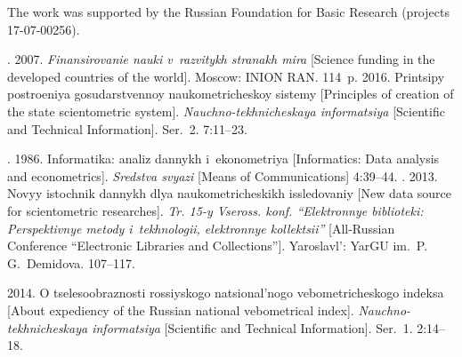     
     


\Ack
    \noindent
     The work was supported by the Russian Foundation for Basic Research  
(projects 17-07-00256).



\vspace*{6pt}

  \begin{multicols}{2}

\renewcommand{\bibname}{\protect\rmfamily References}

{\small\frenchspacing
 {%
 \begin{thebibliography}{99} 
    . 2007. \textit{Finansirovanie nauki 
v~razvitykh stranakh mira} [Science funding in the developed countries of the 
world]. Moscow: INION RAN. 114~p.
     2016. Printsipy postroeniya gosudarstvennoy 
naukometricheskoy sistemy [Principles of creation of the state scientometric system]. 
\textit{Nauchno-tekhnicheskaya informatsiya} [Scientific and Technical 
Information]. Ser.~2. 7:11--23.

    . 1986. Informatika: analiz 
dannykh i~ekonometriya  [Informatics: Data  analysis  and econometrics]. 
\textit{Sredstva  svyazi}  [Means of Communications] 4:39--44.
    . 2013. Novyy istochnik dannykh 
dlya naukometricheskikh issledovaniy [New data source for scientometric 
researches]. \textit{Tr. 15-y Vseross. konf. ``Elektronnye biblioteki: Perspektivnye 
metody i~tekhnologii, elektronnye kollektsii''}  
[All-Russian Conference ``Electronic Libraries and Collections'']. Yaroslavl': YarGU 
im.\ P.\,G.~Demidova.  
107--117.

     2014. O tselesoobraznosti rossiyskogo 
natsional'nogo vebometricheskogo indeksa [About expediency of the Russian 
national vebometrical index]. \textit{Nauchno-tekhnicheskaya informatsiya} 
[Scientific and Technical Information]. Ser.~1. 2:14--18.


\end{thebibliography}}}
\end{multicols}
